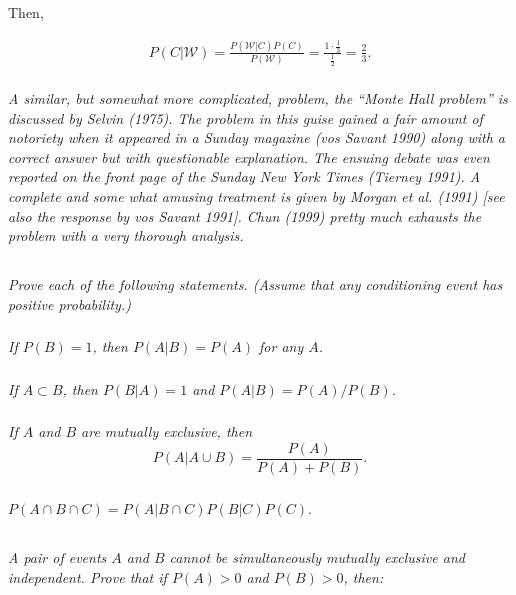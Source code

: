 \documentclass[12pt]{amsart}
\begin{document}
	Then,
	
	\begin{align*}
		P(C|\mathcal W) = \frac{ P(\mathcal W|C) P(C)}{P(\mathcal W)}
		= \frac{1\cdot\frac{1}{3}}{\frac{1}{2}}
		= \frac{2}{3}.
	\end{align*}
	\\[2em]
	
	
\textit{A similar, but somewhat more complicated, problem, the “Monte Hall problem” is discussed by Selvin (1975). 
	The problem in this guise gained a fair amount of notoriety when it appeared in a Sunday magazine (vos Savant 1990) along with a correct
	answer but with questionable explanation. The ensuing debate was even reported on the front page of the Sunday New York Times (Tierney 1991). 
	A complete and some what amusing treatment is given by Morgan et al. (1991) [see also the response by vos Savant 1991]. 
	Chun (1999) pretty much exhausts the problem with a very thorough analysis.}

\subsection{} %
\textit{Prove each of the following statements. (Assume that any conditioning event has positive probability.)}
	\subsubsection{} \textit{If \(P(B) = 1\), then \(P(A|B) = P(A)\) for any \(A\).}
	\subsubsection{} \textit{If \(A \subset B\), then \(P(B|A) = 1\) and \(P(A|B) = P(A)/P(B)\).}
	\subsubsection{} \textit{If \(A\) and \(B\) are mutually exclusive, then}
		\[ P(A|A\cup B) = \frac{P(A)}{P(A) + P(B)}. \]
	\subsubsection{} \(P(A\cap B\cap C) = P(A|B\cap C) P(B|C) P(C)\).

\subsection{} %
\textit{A pair of events \(A\) and \(B\) cannot be simultaneously mutually exclusive and independent.
	Prove that if \(P(A) > 0\) and \(P(B) > 0\), then:}
\end{document}
